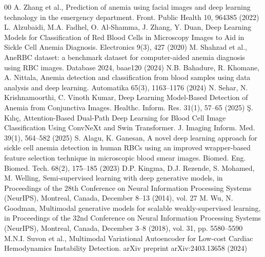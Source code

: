 \documentclass[conference]{IEEEtran}
\begin{document}
\begin{thebibliography}{00}
 A. Zhang et al., Prediction of anemia using facial images and deep learning technology in the emergency department. Front. Public Health 10, 964385 (2022)
 L. Alzubaidi, M.A. Fadhel, O. Al-Shamma, J. Zhang, Y. Duan, Deep Learning Models for Classification of Red Blood Cells in Microscopy Images to Aid in Sickle Cell Anemia Diagnosis. Electronics 9(3), 427 (2020)
 M. Shahzad et al., AneRBC dataset: a benchmark dataset for computer-aided anemia diagnosis using RBC images. Database 2024, baae120 (2024)
 N.B. Bahadure, R. Khomane, A. Nittala, Anemia detection and classification from blood samples using data analysis and deep learning. Automatika 65(3), 1163--1176 (2024)
 N. Sehar, N. Krishnamoorthi, C. Vinoth Kumar, Deep Learning Model-Based Detection of Anemia from Conjunctiva Images. Healthc. Inform. Res. 31(1), 57--65 (2025)
 \c{S}. K{\i}l{\i}\c{c}, Attention-Based Dual-Path Deep Learning for Blood Cell Image Classification Using ConvNeXt and Swin Transformer. J. Imaging Inform. Med. 39(1), 564--582 (2025)
 S. Alagu, K. Ganesan, A novel deep learning approach for sickle cell anemia detection in human RBCs using an improved wrapper-based feature selection technique in microscopic blood smear images. Biomed. Eng. Biomed. Tech. 68(2), 175--185 (2023)
 D.P. Kingma, D.J. Rezende, S. Mohamed, M. Welling, Semi-supervised learning with deep generative models, in Proceedings of the 28th Conference on Neural Information Processing Systems (NeurIPS), Montreal, Canada, December 8--13 (2014), vol. 27
 M. Wu, N. Goodman, Multimodal generative models for scalable weakly-supervised learning, in Proceedings of the 32nd Conference on Neural Information Processing Systems (NeurIPS), Montreal, Canada, December 3--8 (2018), vol. 31, pp. 5580--5590
 M.N.I. Suvon et al., Multimodal Variational Autoencoder for Low-cost Cardiac Hemodynamics Instability Detection. arXiv preprint arXiv:2403.13658 (2024)
\end{thebibliography}
\end{document}
